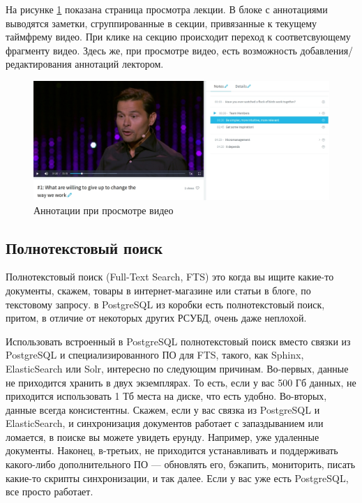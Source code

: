На рисунке \ref{annotations} показана страница просмотра лекции. В блоке с аннотациями
выводятся заметки, сгруппированные в секции, привязанные к текущему таймфрему видео.
При клике на секцию происходит переход к соответсвующему фрагменту видео. Здесь же, при просмотре
видео, есть возможность добавления/редактирования аннотаций лектором.

\begin{figure}[H]
  \centering
  \includegraphics[width=1\textwidth]{images/annotations.jpg}
  \caption{Аннотации при просмотре видео}\label{annotations}
\end{figure}

\subsection{Полнотекстовый поиск}

Полнотекстовый поиск (Full-Text Search, FTS) это когда вы ищите какие-то документы,
скажем, товары в интернет-магазине или статьи в блоге, по текстовому запросу. в PostgreSQL из коробки есть
полнотекстовый поиск, притом, в отличие от некоторых других РСУБД, очень даже неплохой.

Использовать встроенный в PostgreSQL полнотекстовый поиск вместо связки из PostgreSQL и специализированного ПО для FTS,
такого, как Sphinx, ElasticSearch или Solr, интересно по следующим причинам.
Во-первых, данные не приходится хранить в двух экземплярах. То есть, если у вас 500 Гб данных, не приходится использовать
1 Тб места на диске, что есть удобно. Во-вторых, данные всегда консистентны.
Скажем, если у вас связка из PostgreSQL и ElasticSearch, и синхронизация документов работает с запаздыванием
или ломается, в поиске вы можете увидеть ерунду. Например, уже удаленные документы.
Наконец, в-третьих, не приходится устанавливать и поддерживать какого-либо дополнительного ПО —
обновлять его, бэкапить, мониторить, писать какие-то скрипты синхронизации, и так далее.
Если у вас уже есть PostgreSQL, все просто работает.


